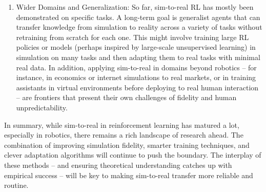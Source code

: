 \begin{enumerate}
    \item Wider Domains and Generalization: So far, sim-to-real RL has mostly been demonstrated on specific tasks. A long-term goal is generalist agents that can transfer knowledge from simulation to reality across a variety of tasks without retraining from scratch for each one. This might involve training large RL policies or models (perhaps inspired by large-scale unsupervised learning) in simulation on many tasks and then adapting them to real tasks with minimal real data. In addition, applying sim-to-real in domains beyond robotics – for instance, in economics or internet simulations to real markets, or in training assistants in virtual environments before deploying to real human interaction – are frontiers that present their own challenges of fidelity and human unpredictability.
\end{enumerate}

In summary, while sim-to-real in reinforcement learning has matured a lot, especially in robotics, there remains a rich landscape of research ahead. The combination of improving simulation fidelity, smarter training techniques, and clever adaptation algorithms will continue to push the boundary. The interplay of these methods – and ensuring theoretical understanding catches up with empirical success – will be key to making sim-to-real transfer more reliable and routine.
